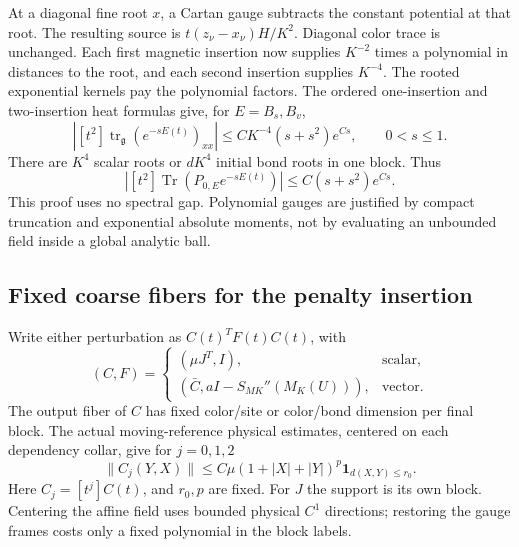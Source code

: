 \documentclass[11pt]{article}
\theoremstyle{remark}
\begin{document}
At a diagonal fine root $x$, a Cartan gauge subtracts the constant
potential at that root. The resulting source is
$t(z_\nu-x_\nu)H/K^2$. Diagonal color trace is unchanged.
Each first magnetic insertion now supplies $K^{-2}$ times a polynomial
in distances to the root, and each second insertion supplies $K^{-4}$.
The rooted exponential kernels pay the polynomial factors. The ordered
one-insertion and two-insertion heat formulas give, for $E=B_s,B_v$,
\begin{equation}
 \left|[t^2]\operatorname{tr}_{\mathfrak g}
      (e^{-sE(t)})_{xx}\right|
       \le CK^{-4}(s+s^2)e^{Cs},\qquad 0<s\le1.
 \label{suv-fine-root}
\end{equation}
There are $K^4$ scalar roots or $dK^4$ initial bond roots in one block.
Thus
\begin{equation}
 \left|[t^2]\operatorname{Tr}(P_{0,E}e^{-sE(t)})\right|
       \le C(s+s^2)e^{Cs}.
 \label{suv-base-bound}
\end{equation}
This proof uses no spectral gap. Polynomial gauges are justified by
compact truncation and exponential absolute moments, not by evaluating
an unbounded field inside a global analytic ball.

\subsection{Fixed coarse fibers for the penalty insertion}
\label{suv-penalty-section}

Write either perturbation as $C(t)^TF(t)C(t)$, with
\begin{equation}
 (C,F)=
 \begin{cases}
   (\mu J^T,I),&\text{scalar},\\
   (\bar C,aI-S_{MK}''(M_K(U))),&\text{vector}.
 \end{cases}
 \label{suv-factor-table}
\end{equation}
The output fiber of $C$ has fixed color/site or color/bond dimension
per final block. The actual moving-reference physical estimates,
centered on each dependency collar, give for $j=0,1,2$
\begin{equation}
 \|C_j(Y,X)\|\le C\mu(1+|X|+|Y|)^p
                         \mathbf1_{d(X,Y)\le r_0}.
 \label{suv-C-jets}
\end{equation}
Here $C_j=[t^j]C(t)$, and $r_0,p$ are fixed. For $J$ the support
is its own block. Centering the affine field uses bounded physical
$C^1$ directions; restoring the gauge frames costs only a fixed
polynomial in the block labels.
\end{document}
